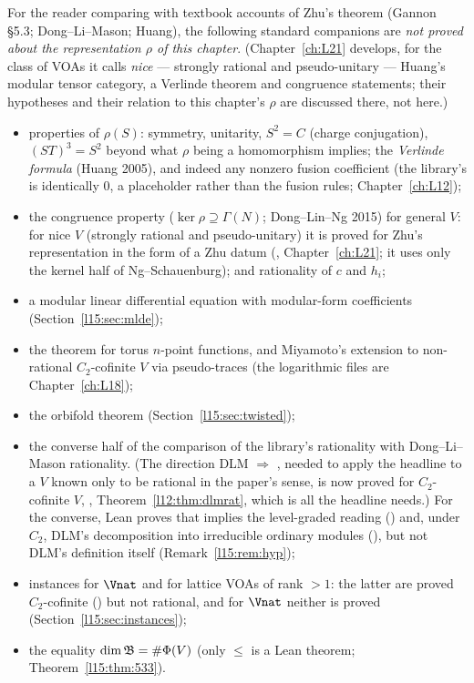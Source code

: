 For the reader comparing with textbook accounts of Zhu's theorem (Gannon \S5.3; Dong--Li--Mason; Huang), the following
standard companions are \emph{not proved about the representation $\rho$ of this chapter}. (Chapter~\ref{ch:L21} develops, for
the class of VOAs it calls \emph{nice} --- strongly rational and pseudo-unitary --- Huang's modular tensor category, a
Verlinde theorem and congruence statements; their hypotheses and their relation to this chapter's $\rho$ are discussed
there, not here.)
\begin{itemize}
\item properties of $\rho(S)$: symmetry, unitarity, $S^2=C$ (charge conjugation), $(ST)^3=S^2$ beyond what $\rho$ being a
  homomorphism implies; the \emph{Verlinde formula} (Huang 2005), and indeed any nonzero fusion coefficient (the library's
   is identically $0$, a placeholder rather than the fusion rules; Chapter~\ref{ch:L12});
\item the congruence property ($\ker\rho\supseteq\Gamma(N)$; Dong--Lin--Ng 2015) for general $V$: for nice $V$ (strongly
  rational and pseudo-unitary) it is proved for Zhu's representation in the form of a Zhu datum
  (\allowbreak{}\allowbreak{}, Chapter~\ref{ch:L21}; it uses
  only the kernel half of Ng--Schauenburg); and rationality of $c$ and $h_i$;
\item a modular linear differential equation with modular-form coefficients (Section~\ref{l15:sec:mlde});
\item the theorem for torus $n$-point functions, and Miyamoto's extension to non-rational $C_2$-cofinite $V$ via pseudo-traces
  (the logarithmic files are Chapter~\ref{ch:L18});
\item the orbifold theorem (Section~\ref{l15:sec:twisted});
\item the converse half of the comparison of the library's rationality  with Dong--Li--Mason
  rationality. (The direction DLM $\Rightarrow$ , needed to apply the headline to a $V$ known
  only to be rational in the paper's sense, is now proved for $C_2$-cofinite $V$, ,
  Theorem~\ref{l12:thm:dlmrat}, which is all the headline needs.) For the converse, Lean proves that
   implies the level-graded reading () and,
  under $C_2$, DLM's decomposition into irreducible ordinary modules
  (\allowbreak{}\allowbreak{}\allowbreak{}\allowbreak{}),
  but not DLM's definition itself (Remark~\ref{l15:rem:hyp});
\item instances for $\Vnat$ and for lattice VOAs of rank $>1$: the latter are proved $C_2$-cofinite
  () but not rational, and for $\Vnat$ neither is proved (Section~\ref{l15:sec:instances});
\item the equality $\dim\mathfrak{B}=\#\Phi(V)$ (only $\le$ is a Lean theorem; Theorem~\ref{l15:thm:533}).
\end{itemize}
